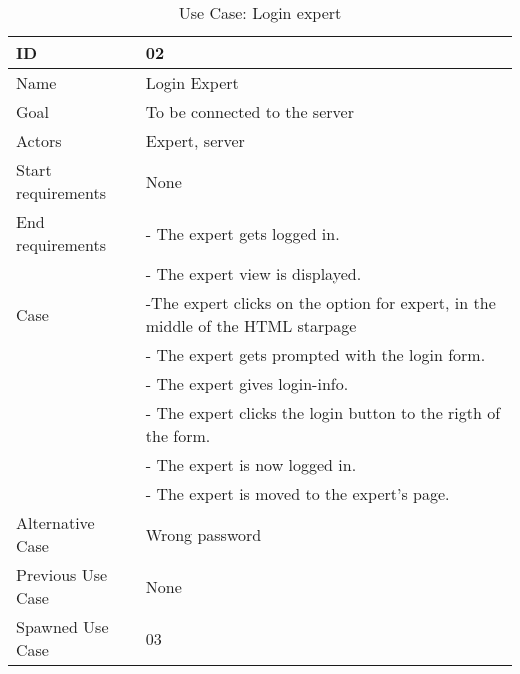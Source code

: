 \begin{table}[H]
\begin{tabular}{|l|l|} \hline
	\textbf{ID} & \textbf{02}\\ \hline
	Name & Login Expert\\ \hline
	Goal & To be connected to the server\\ \hline
	Actors & Expert, server\\ \hline
	Start requirements & None\\ \hline
	End requirements & - The expert gets logged in.\\
					 & - The expert view is displayed.\\ \hline
	Case & -The expert clicks on the option for expert, in the middle of the HTML starpage\\
			& - The expert gets prompted with the login form. \\
		 	& - The expert gives login-info.\\
			& - The expert clicks the login button to the rigth of the form.\\
			& - The expert is now logged in.\\ 
			& - The expert is moved to the expert's page. \\ \hline
	Alternative Case & Wrong password\\ \hline
	Previous Use Case & None\\ \hline
	Spawned Use Case & 03\\ \hline
\end{tabular}
\caption{Use Case: Login expert}
\label{fig:usecase02table}
\end{table}

